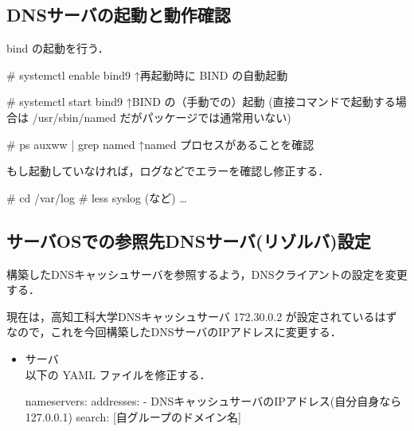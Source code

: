 

\subsection{DNSサーバの起動と動作確認}

bind の起動を行う．

\begin{cli}
# systemctl enable bind9
    ↑再起動時に BIND の自動起動

# systemctl start bind9
    ↑BIND の（手動での）起動
(直接コマンドで起動する場合は /usr/sbin/named だがパッケージでは通常用いない)

# ps auxww | grep named
    ↑named プロセスがあることを確認
\end{cli}

もし起動していなければ，ログなどでエラーを確認し修正する．
\begin{cli}
# cd /var/log
# less syslog (など)
 …
\end{cli}


\subsection{サーバOSでの参照先DNSサーバ(リゾルバ)設定}

構築したDNSキャッシュサーバを参照するよう，DNSクライアントの設定を変更する．

現在は，高知工科大学DNSキャッシュサーバ 172.30.0.2 が設定されているはずなので，これを今回構築したDNSサーバのIPアドレスに変更する．

\begin{itemize}
  \item サーバ\\
	 以下の YAML ファイルを修正する．
\begin{cli}
      nameservers:
        addresses:
          - DNSキャッシュサーバのIPアドレス(自分自身なら127.0.0.1)
        search: [自グループのドメイン名]
\end{cli}
\end{itemize}

